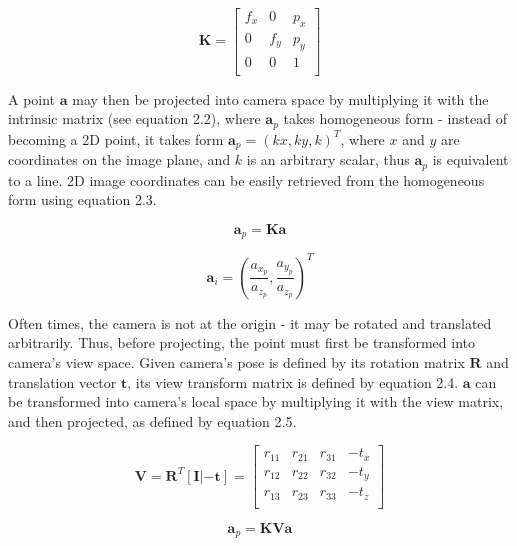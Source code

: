 \documentclass[11pt,english]{report}
\begin{document}
\begin{equation}
	\mathbf{K} =
	\left[ {\begin{array}{ccc}
		f_x & 0 & p_x \\
		0 & f_y & p_y \\
		0 & 0 & 1 \\
	\end{array} } \right]
\end{equation}

A point $\mathbf{a}$ may then be projected into camera space by multiplying it with the intrinsic matrix (see equation 2.2), where $\mathbf{a}_p$ takes homogeneous form - instead of becoming a 2D point, it takes form $\mathbf{a}_p = (kx, ky, k)^T$, where $x$ and $y$ are coordinates on the image plane, and $k$ is an arbitrary scalar, thus $\mathbf{a}_p$ is equivalent to a line. 2D image coordinates can be easily retrieved from the homogeneous form using equation 2.3.

\begin{equation}
	\mathbf{a}_p = \mathbf{Ka}
\end{equation}

\begin{equation}
	\mathbf{a}_i = \left({
		\frac{a_{x_p}}{a_{z_p}}, \frac{a_{y_p}}{a_{z_p}}
	}\right)^T
\end{equation}

Often times, the camera is not at the origin - it may be rotated and translated arbitrarily. Thus, before projecting, the point must first be transformed into camera's view space. Given camera's pose is defined by its rotation matrix $\mathbf{R}$ and translation vector $\mathbf{t}$, its view transform matrix is defined by equation 2.4. $\mathbf{a}$ can be transformed into camera's local space by multiplying it with the view matrix, and then projected, as defined by equation 2.5.

\begin{equation}
	\mathbf{V} = \mathbf{R}^T[\mathbf{I}|-\mathbf{t}] = 
	\left[ {\begin{array}{cccc}
		r_{11} & r_{21} & r_{31} & - t_x \\
		r_{12} & r_{22} & r_{32} & - t_y \\
		r_{13} & r_{23} & r_{33} & - t_z \\
	\end{array} } \right]
\end{equation}

\begin{equation}
	\mathbf{a}_p = \mathbf{KVa}
\end{equation}
\end{document}
